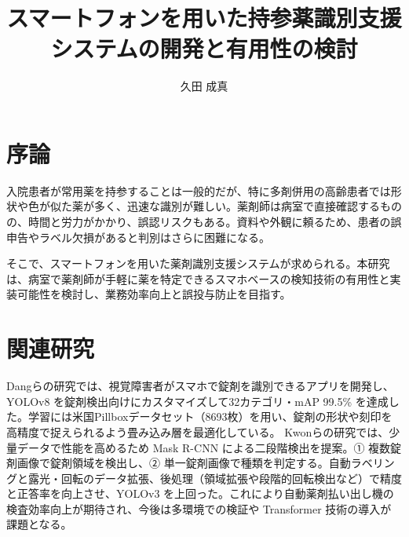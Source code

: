 \documentclass[twocolumn,12pt]{article}
\title{スマートフォンを用いた持参薬識別支援システムの開発と有用性の検討}
\author{久田 成真}
\date{}
\begin{document}
\maketitle
\section{序論}

入院患者が常用薬を持参することは一般的だが、特に多剤併用の高齢患者では形状や色が似た薬が多く、迅速な識別が難しい。薬剤師は病室で直接確認するものの、時間と労力がかかり、誤認リスクもある。資料や外観に頼るため、患者の誤申告やラベル欠損があると判別はさらに困難になる。

そこで、スマートフォンを用いた薬剤識別支援システムが求められる。本研究は、病室で薬剤師が手軽に薬を特定できるスマホベースの検知技術の有用性と実装可能性を検討し、業務効率向上と誤投与防止を目指す。


\section{関連研究}


Dangらの研究\cite{Dang_2024}では、視覚障害者がスマホで錠剤を識別できるアプリを開発し、YOLOv8 を錠剤検出向けにカスタマイズして32カテゴリ・mAP 99.5\% を達成した。学習には米国Pillboxデータセット（8693枚）を用い、錠剤の形状や刻印を高精度で捉えられるよう畳み込み層を最適化している。
Kwonらの研究では、\cite{chemosensors10010004}少量データで性能を高めるため Mask R-CNN による二段階検出を提案。① 複数錠剤画像で錠剤領域を検出し、② 単一錠剤画像で種類を判定する。自動ラベリングと露光・回転のデータ拡張、後処理（領域拡張や段階的回転検出など）で精度と正答率を向上させ、YOLOv3 を上回った。これにより自動薬剤払い出し機の検査効率向上が期待され、今後は多環境での検証や Transformer 技術の導入が課題となる。


\end{document}
